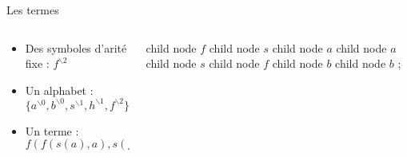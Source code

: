 \begin{frame}{Les termes}
  \begin{columns}
    \begin{column}{0.65\textwidth}
      \begin{block}{}
        \begin{itemize}[<+->]
        \item Des symboles d'arité fixe : $f^{\backslash 2}$
        \item Un alphabet : $\{ a^{\backslash 0}, b^{\backslash 0}, s^{\backslash 1}, h^{\backslash 1}, f^{\backslash 2}\}$
        \item Un terme : $f(f(s(a), a),s(f(b,b)))$
        \end{itemize}
      \end{block}
    \end{column}
    \begin{column}{0.35\textwidth}
      \begin{center}
        \begin{tikz}
          child { node {$f$}
            child { node {$s$}
              child { node {$a$} } }
            child { node {$a$} } }
          child { node {$s$}
            child {node {$f$}
              child { node {$b$} }
              child { node {$b$} } } };
        \end{tikz}
      \end{center}
    \end{column}
  \end{columns}
\end{frame}

